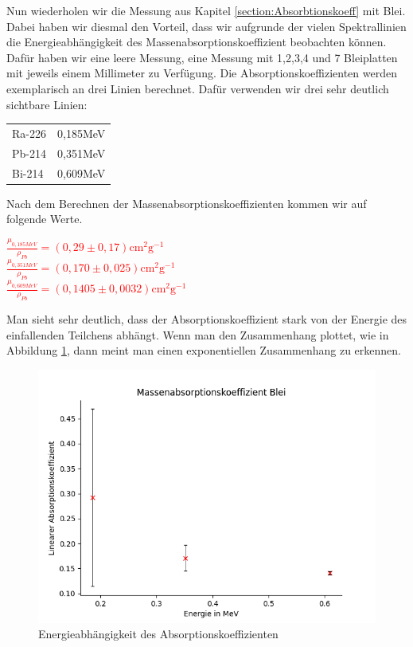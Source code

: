 Nun wiederholen wir die Messung aus Kapitel \ref{section:Absorbtionskoeff} mit Blei. Dabei haben wir diesmal den Vorteil, dass wir aufgrunde der vielen 
Spektrallinien die Energieabhängigkeit des Massenabsorptionskoeffizient beobachten können. Dafür haben wir eine leere Messung, eine Messung mit 1,2,3,4 und 7 Bleiplatten mit 
jeweils einem Millimeter zu Verfügung. Die Absorptionskoeffizienten  werden exemplarisch an drei Linien berechnet. 
Dafür verwenden wir drei sehr deutlich sichtbare Linien:
\begin{center}
    \centering
    \begin{tabular}{lr}
        Ra-226 & 0,185MeV\\
        Pb-214 & 0,351MeV\\
        Bi-214 & 0,609MeV\\
    \end{tabular}
\end{center}

Nach dem Berechnen der Massenabsorptionskoeffizienten kommen wir auf folgende Werte.


\begin{center}
    \centering
    \textcolor{red}{$\frac{\mu_{0,185MeV}}{\rho_{Pb}} = (0,29\pm0,17) \mathrm{cm}^{2} \mathrm{g}^{-1}$}\\
    \textcolor{red}{$\frac{\mu_{0,351MeV}}{\rho_{Pb}}= (0,170\pm0,025) \mathrm{cm}^{2} \mathrm{g}^{-1}$}\\
    \textcolor{red}{$\frac{\mu_{0,609MeV}}{\rho_{Pb}}= (0,1405\pm0,0032) \mathrm{cm}^{2} \mathrm{g}^{-1}$}\\
\end{center}

Man sieht sehr deutlich, dass der Absorptionskoeffizient stark von der Energie des einfallenden Teilchens abhängt. Wenn man den Zusammenhang plottet, wie in Abbildung \ref{AbsEne}, dann meint man 
einen exponentiellen Zusammenhang zu erkennen.

\begin{figure}
    \centering
    \includegraphics[width = 12cm]{Bilder/Auswertung/AbsorbtionBleiEnergie.png}
    \caption{Energieabhängigkeit des Absorptionskoeffizienten}
    \label{AbsEne}
\end{figure}

